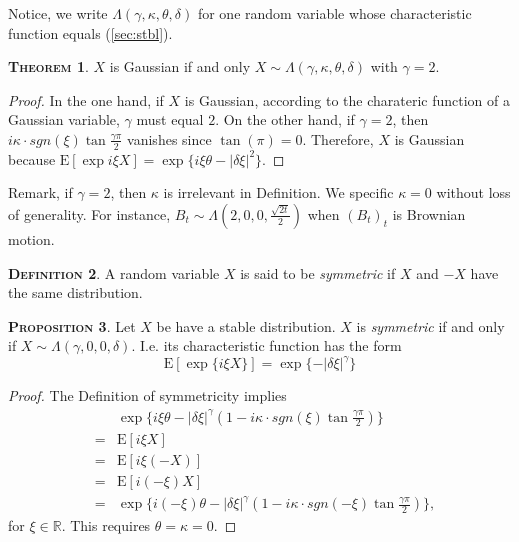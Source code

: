 \documentclass[a4paper, twoside, 11pt]{article}
\theoremstyle{definition}
\newtheorem{definition}{\scshape Definition}[section]
\newtheorem{theorem}[definition]{\scshape Theorem}
\newtheorem{proposition}[definition]{\scshape Proposition}
\begin{document}
Notice, we write $\Lambda(\gamma, \kappa, \theta, \delta)$ for one random variable whose characteristic function equals (\ref{sec:stbl}).

\begin{theorem}
  $X$ is Gaussian if and only $X \sim \Lambda(\gamma, \kappa, \theta, \delta)$ with $\gamma = 2$.
\end{theorem}
\begin{proof}
  In the one hand, if $X$ is Gaussian, according to the charateric function of a Gaussian variable, $\gamma$ must equal $2$. On the other hand, if $\gamma = 2$, then $i\kappa\cdot sgn(\xi)\tan \frac{\gamma\pi}{2}$ vanishes since $\tan(\pi) = 0$. Therefore, $X$ is Gaussian because $\mathrm{E} [\exp i\xi X]=\exp\{i \xi \theta - |\delta\xi|^2\}$.
\end{proof}
Remark, if $\gamma=2$, then $\kappa$ is irrelevant in Definition. We specific $\kappa = 0$ without loss of generality. For instance, $B_t \sim \Lambda(2, 0, 0, \frac{\sqrt{2t}}{2})$ when $(B_t)_t$ is Brownian motion.

\begin{definition}
  A random variable $X$ is said to be \emph{symmetric} if $X$ and $-X$ have the same distribution.
\end{definition}

\begin{proposition}
  Let $X$ be have a stable distribution. $X$ is  \emph{symmetric} if and only if $X \sim \Lambda(\gamma, 0, 0, \delta)$. I.e. its characteristic function has the form
  \begin{equation}
	\mathrm{E}[\exp\{i \xi X\}] = \exp\{-|\delta\xi|^\gamma\}
  \end{equation}
\end{proposition}
\begin{proof}
  The Definition of symmetricity implies
  \begin{eqnarray*}
	&&\exp\{i \xi \theta - |\delta\xi|^\gamma(1-i\kappa\cdot sgn(\xi)\tan \frac{\gamma\pi}{2})\}\\
	&=& \mathrm{E}[i\xi X]\\
	&=& \mathrm{E}[i\xi (-X)]\\
	&=& \mathrm{E}[i (-\xi) X]\\
	&=& \exp\{i (-\xi) \theta - |\delta\xi|^\gamma(1-i\kappa\cdot sgn(-\xi)\tan \frac{\gamma\pi}{2})\},
  \end{eqnarray*}
  for $\xi \in \mathbb{R}$. This requires $\theta=\kappa=0$.
\end{proof}
\end{document}
